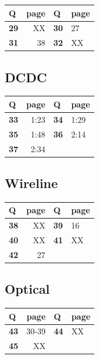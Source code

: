 \documentclass[
  a4paper,
]{article}
\begin{document}
\begin{longtable}[]{@{}lrll@{}}
\toprule\noalign{}
Q & page & Q & page \\
\midrule\noalign{}
\endhead
\bottomrule\noalign{}
\endlastfoot
\textbf{29} & XX & \textbf{30} & 27 \\
\textbf{31} & 38 & \textbf{32} & XX \\
\end{longtable}

\hypertarget{dcdc}{%
\subsection{DCDC}\label{dcdc}}

\begin{longtable}[]{@{}lrll@{}}
\toprule\noalign{}
Q & page & Q & page \\
\midrule\noalign{}
\endhead
\bottomrule\noalign{}
\endlastfoot
\textbf{33} & 1:23 & \textbf{34} & 1:29 \\
\textbf{35} & 1:48 & \textbf{36} & 2:14 \\
\textbf{37} & 2:34 & & \\
\end{longtable}

\hypertarget{wireline}{%
\subsection{Wireline}\label{wireline}}

\begin{longtable}[]{@{}lrll@{}}
\toprule\noalign{}
Q & page & Q & page \\
\midrule\noalign{}
\endhead
\bottomrule\noalign{}
\endlastfoot
\textbf{38} & XX & \textbf{39} & 16 \\
\textbf{40} & XX & \textbf{41} & XX \\
\textbf{42} & 27 & & \\
\end{longtable}

\hypertarget{optical}{%
\subsection{Optical}\label{optical}}

\begin{longtable}[]{@{}lrll@{}}
\toprule\noalign{}
Q & page & Q & page \\
\midrule\noalign{}
\endhead
\bottomrule\noalign{}
\endlastfoot
\textbf{43} & 30-39 & \textbf{44} & XX \\
\textbf{45} & XX & & \\
\end{longtable}
\end{document}
